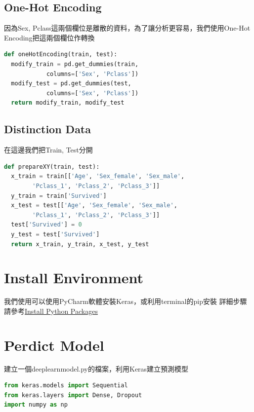 \documentclass[12pt,a4paper]{article}
\begin{document}
{{\subsection{One-Hot Encoding}
因為Sex, Pclass這兩個欄位是離散的資料，為了讓分析更容易，我們使用One-Hot Encoding把這兩個欄位作轉換

\begin{shaded}
\begin{lstlisting}[language=Python]
def oneHotEncoding(train, test):
  modify_train = pd.get_dummies(train, 
  			columns=['Sex', 'Pclass'])
  modify_test = pd.get_dummies(test, 
  			columns=['Sex', 'Pclass'])
  return modify_train, modify_test
\end{lstlisting}
\end{shaded}

\subsection{Distinction Data}
在這邊我們把Train, Test分開

\begin{shaded}
\begin{lstlisting}[language=Python]
def prepareXY(train, test):
  x_train = train[['Age', 'Sex_female', 'Sex_male', 
  		'Pclass_1', 'Pclass_2', 'Pclass_3']]
  y_train = train['Survived']
  x_test = test[['Age', 'Sex_female', 'Sex_male', 
  		'Pclass_1', 'Pclass_2', 'Pclass_3']]
  test['Survived'] = 0
  y_test = test['Survived']
  return x_train, y_train, x_test, y_test
\end{lstlisting}
\end{shaded}
}

\section{Install Environment}
我們使用可以使用PyCharm軟體安裝Keras，或利用terminal的pip安裝
詳細步驟請參考\href{https://medium.com/@willywu/%E5%88%A9%E7%94%A8pip%E5%AE%89%E8%A3%9Dpython-package-dc3e82348c29}{Install Python Packages}

\section{Perdict Model}
建立一個deeplearnmodel.py的檔案，利用Keras建立預測模型

\begin{shaded}
\begin{lstlisting}[language=Python]
from keras.models import Sequential
from keras.layers import Dense, Dropout
import numpy as np


\end{lstlisting}
\end{shaded}}
\end{document}
